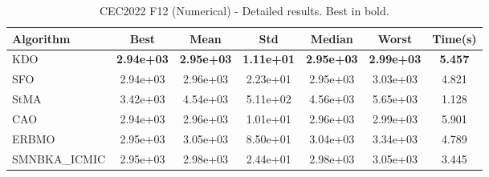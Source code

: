 \begin{table}[H]
\centering\small
\caption{CEC2022 F12 (Numerical) - Detailed results. Best in bold.}
\label{tab:cec2022_F12}
\begin{tabular}{lcccccc}
\toprule
\textbf{Algorithm} & \textbf{Best} & \textbf{Mean} & \textbf{Std} & \textbf{Median} & \textbf{Worst} & \textbf{Time(s)} \\
\midrule
KDO & \textbf{2.94e+03} & \textbf{2.95e+03} & \textbf{1.11e+01} & \textbf{2.95e+03} & \textbf{2.99e+03} & \textbf{5.457} \\
SFO & 2.94e+03 & 2.96e+03 & 2.23e+01 & 2.95e+03 & 3.03e+03 & 4.821 \\
StMA & 3.42e+03 & 4.54e+03 & 5.11e+02 & 4.56e+03 & 5.65e+03 & 1.128 \\
CAO & 2.94e+03 & 2.96e+03 & 1.01e+01 & 2.96e+03 & 2.99e+03 & 5.901 \\
ERBMO & 2.95e+03 & 3.05e+03 & 8.50e+01 & 3.04e+03 & 3.34e+03 & 4.789 \\
SMNBKA_ICMIC & 2.95e+03 & 2.98e+03 & 2.44e+01 & 2.98e+03 & 3.05e+03 & 3.445 \\
\bottomrule
\end{tabular}
\end{table}
